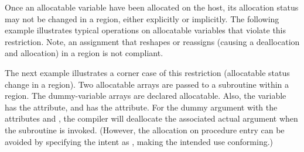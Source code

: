 Once an allocatable variable have been allocated on the host,
its allocation status may not be changed in a  region, either
explicitly or implicitly. The following example illustrates typical
operations on allocatable variables that violate this restriction.
Note, an assignment that reshapes or reassigns (causing a deallocation
and allocation) in a  region is not compliant.


The next example illustrates a corner case of this restriction (allocatable status
change in a  region).
Two allocatable arrays are passed to a subroutine within a 
region. The dummy-variable arrays are declared allocatable.
Also, the  variable has the  attribute, and 
has the  attribute. 
For the dummy argument with the attributes  and , 
the compiler will deallocate the associated actual argument when the subroutine is invoked. 
(However, the allocation on procedure entry can be avoided by specifying the intent 
as , making the intended use conforming.)

